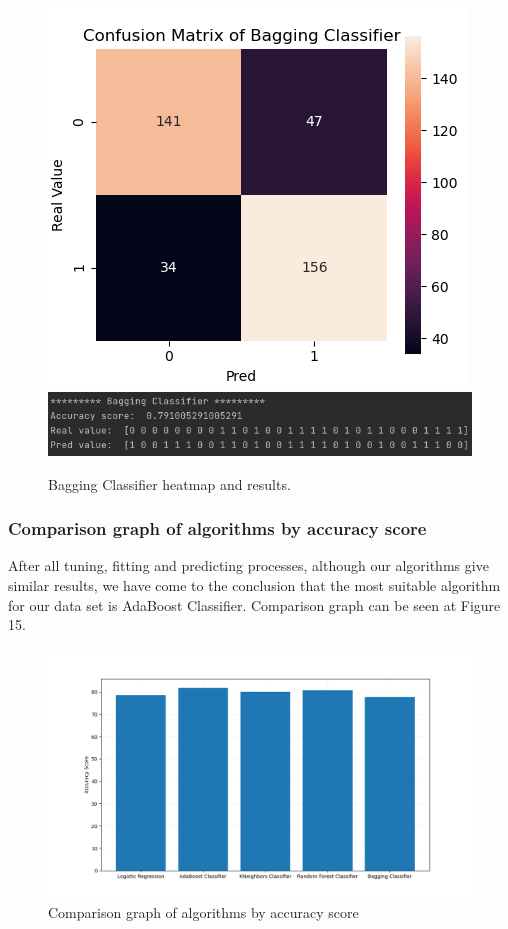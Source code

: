 \documentclass[onecolumn]{article}
\begin{document}
\begin{figure}[h]
\centering
{\centering
    \includegraphics[width=.49\linewidth]{fig/fig_bag2.png}
        \label{figure19}}
{\centering
    \includegraphics[width=.49\linewidth]{fig/fig_bag1.png}
        \label{figure20}}
\caption{\label{Bagging Classifier}Bagging Classifier heatmap and results.}
\end{figure}



\subsubsection{Comparison graph of algorithms by accuracy score}
After all tuning, fitting and predicting processes, although our algorithms give similar results, we have come to the conclusion that the most suitable algorithm for our data set is AdaBoost Classifier. Comparison graph can be seen at Figure 15.


\begin{figure}[h]
\centering
    \includegraphics[width=1\linewidth]{fig/figgg.png}
\caption{\label{figure21}
Comparison graph of algorithms by accuracy score}
\end{figure}
\end{document}
